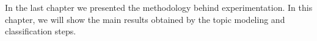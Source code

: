 In the last chapter we presented the methodology behind experimentation. In this chapter, we will show the 
main results obtained by the topic modeling and classification steps.